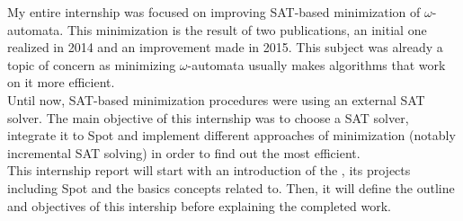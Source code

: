 My entire internship was focused on improving SAT-based minimization of $\omega$-automata. This minimization
is the result of two publications, an initial one realized in 2014 and an improvement made in 2015.
This subject was already a topic of concern as minimizing $\omega$-automata usually makes algorithms that
work on it more efficient.\\

Until now, SAT-based minimization procedures were using an external SAT solver. The main objective of this
internship was to choose a SAT solver, integrate it to Spot and implement different approaches of
minimization (notably incremental SAT solving) in order to find out the most efficient.\\

This internship report will start with an introduction of the \LRDE\space, its projects including Spot and the
basics concepts related to. Then, it will define the outline and objectives of this intership before
explaining the completed work.